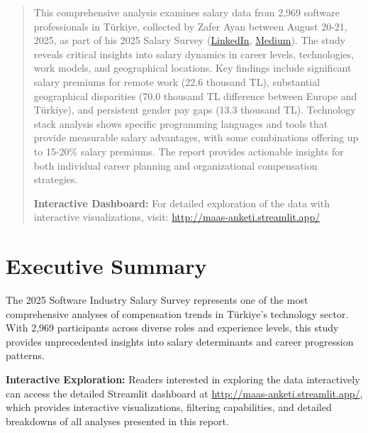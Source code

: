 \documentclass[12pt,a4paper]{article}
\begin{document}
\maketitle

\tableofcontents
\newpage

\begin{abstract}
This comprehensive analysis examines salary data from 2,969 software professionals in Türkiye, collected by Zafer Ayan between August 20-21, 2025, as part of his 2025 Salary Survey (\href{https://www.linkedin.com/posts/zaferayan_geleneksel-maa%C5%9F-anketi-buyrun-httpslnkdin-activity-7363866008664629248-7YcQ}{LinkedIn}, \href{https://zaferayan.medium.com/2025-ağustos-detaylı-maaş-anketi-98446d71920a}{Medium}). The study reveals critical insights into salary dynamics in career levels, technologies, work models, and geographical locations. Key findings include significant salary premiums for remote work (22.6 thousand TL), substantial geographical disparities (70.0 thousand TL difference between Europe and Türkiye), and persistent gender pay gaps (13.3 thousand TL). Technology stack analysis shows specific programming languages and tools that provide measurable salary advantages, with some combinations offering up to 15-20\% salary premiums. The report provides actionable insights for both individual career planning and organizational compensation strategies.

\textbf{Interactive Dashboard:} For detailed exploration of the data with interactive visualizations, visit: \href{http://maas-anketi.streamlit.app/}{http://maas-anketi.streamlit.app/}
\end{abstract}

\section{Executive Summary}

The 2025 Software Industry Salary Survey represents one of the most comprehensive analyses of compensation trends in Türkiye's technology sector. With 2,969 participants across diverse roles and experience levels, this study provides unprecedented insights into salary determinants and career progression patterns.

\textbf{Interactive Exploration:} Readers interested in exploring the data interactively can access the detailed Streamlit dashboard at \href{http://maas-anketi.streamlit.app/}{http://maas-anketi.streamlit.app/}, which provides interactive visualizations, filtering capabilities, and detailed breakdowns of all analyses presented in this report.
\end{document}
